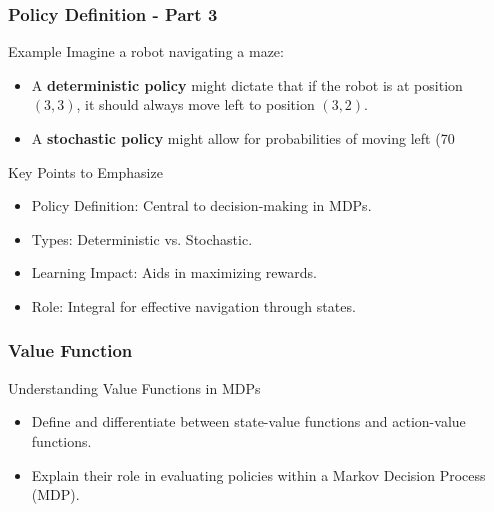 \documentclass[aspectratio=169]{beamer}
\begin{document}
\begin{frame}[fragile]
    \frametitle{Policy Definition - Part 3}
    \begin{block}{Example}
        Imagine a robot navigating a maze:
        \begin{itemize}
            \item A \textbf{deterministic policy} might dictate that if the robot is at position \( (3, 3) \), it should always move left to position \( (3, 2) \).
            \item A \textbf{stochastic policy} might allow for probabilities of moving left (70%
        \end{itemize}
    \end{block}

    \begin{block}{Key Points to Emphasize}
        \begin{itemize}
            \item Policy Definition: Central to decision-making in MDPs.
            \item Types: Deterministic vs. Stochastic.
            \item Learning Impact: Aids in maximizing rewards.
            \item Role: Integral for effective navigation through states.
        \end{itemize}
    \end{block}
\end{frame}

\begin{frame}[fragile]
    \frametitle{Value Function}
    \begin{block}{Understanding Value Functions in MDPs}
        \begin{itemize}
            \item Define and differentiate between state-value functions and action-value functions.
            \item Explain their role in evaluating policies within a Markov Decision Process (MDP).
        \end{itemize}
    \end{block}
\end{frame}
\end{document}
